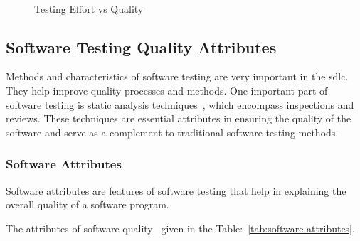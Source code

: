 
\begin{figure}[h]
    \caption{Testing Effort vs Quality~\cite{arumugam2019software}}~\label{fig:software_testing_quality}
\end{figure}

\subsection{Software Testing Quality Attributes}

Methods and characteristics of software testing are very important in the
\acrshort{sdlc}. They help improve quality processes and
methods. One important part of software testing is static analysis techniques~\cite{zheng2006value}, which encompass inspections and reviews.
These techniques are essential attributes in ensuring the quality of the software and serve as a complement to
traditional software testing methods.

\subsubsection{Software Attributes}

Software attributes are features of software testing that help in explaining the
overall quality of a software program.

The attributes of software quality~\cite{mili2015software} given in
the Table:~\ref{tab:software-attributes}.

